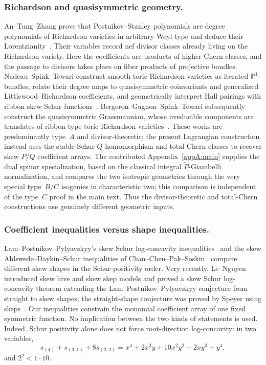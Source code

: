 \documentclass[11pt,a4paper,oneside]{amsart}
\numberwithin{equation}{section}
\theoremstyle{definition}
\theoremstyle{remark}
\begin{document}
\subsubsection{Richardson and quasisymmetric geometry.}
An--Tung--Zhang prove that Postnikov--Stanley polynomials are degree polynomials of Richardson varieties in arbitrary Weyl type and deduce their Lorentzianity~\cite[Proposition~3.3 and Theorem~1.2]{ATZ24}.  Their variables record nef divisor classes already living on the Richardson variety.  Here the coefficients are products of higher Chern classes, and the passage to divisors takes place on fiber products of projective bundles.  Nadeau--Spink--Tewari construct smooth toric Richardson varieties as iterated $\mathbb P^1$-bundles, relate their degree maps to quasisymmetric coinvariants and generalized Littlewood--Richardson coefficients, and geometrically interpret Hall pairings with ribbon skew Schur functions~\cite[Theorem~2.2 and Corollary~10.3]{NST24}.  Bergeron--Gagnon--Spink--Tewari subsequently construct the quasisymmetric Grassmannian, whose irreducible components are translates of ribbon-type toric Richardson varieties~\cite{BGST26}.  These works are predominantly type~$A$ and divisor-theoretic; the present Lagrangian construction instead uses the stable Schur-$Q$ homomorphism and total Chern classes to recover skew $P/Q$ coefficient arrays.  The contributed Appendix~\ref{appA:main} supplies the dual spinor specialization, based on the classical integral $\widetilde P$-Giambelli normalization, and compares the two isotropic geometries through the very special type~$B/C$ isogenies in characteristic two; this comparison is independent of the type~$C$ proof in the main text.  Thus the divisor-theoretic and total-Chern constructions use genuinely different geometric inputs.

\subsubsection{Coefficient inequalities versus shape inequalities.}
Lam--Postnikov--Pylyavskyy's skew Schur log-concavity inequalities~\cite{LPP07} and the skew Ahlswede--Daykin--Schur inequalities of Chan--Chen--Pak--Soskin~\cite[Theorem~1.7]{CCPS26} compare different skew shapes in the Schur-positivity order.  Very recently, Le--Nguyen introduced skew hive and skew skep models and proved a skew Schur log-concavity theorem extending the Lam--Postnikov--Pylyavskyy conjecture from straight to skew shapes; the straight-shape conjecture was proved by Speyer using skeps~\cite{Speyer26,LeNguyen26}.  Our inequalities constrain the monomial coefficient array of one fixed symmetric function.  No implication between the two kinds of statements is used.  Indeed, Schur positivity alone does not force root-direction log-concavity: in two variables,
\[
 s_{(4)}+s_{(3,1)}+8s_{(2,2)}
 =x^4+2x^3y+10x^2y^2+2xy^3+y^4,
\]
and $2^2<1\cdot10$.
\end{document}
